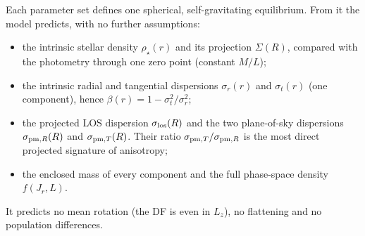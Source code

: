 \documentclass[11pt,a4paper]{article}
\begin{document}
Each parameter set defines one spherical, self-gravitating equilibrium. From
it the model predicts, with no further assumptions:
\begin{itemize}
\item the intrinsic stellar density $\rho_\star(r)$ and its projection
  $\Sigma(R)$, compared with the photometry through one zero point
  (constant $M/L$);
\item the intrinsic radial and tangential dispersions $\sigma_r(r)$ and
  $\sigma_t(r)$ (one component), hence $\beta(r)=1-\sigma_t^2/\sigma_r^2$;
\item the projected LOS dispersion $\sigma_{\rm los}(R)$ and the two
  plane-of-sky dispersions $\sigma_{{\rm pm},R}(R)$ and
  $\sigma_{{\rm pm},T}(R)$. Their ratio
  $\sigma_{{\rm pm},T}/\sigma_{{\rm pm},R}$ is the most direct projected
  signature of anisotropy;
\item the enclosed mass of every component and the full phase-space density
  $f(J_r,L)$.
\end{itemize}
It predicts no mean rotation (the DF is even in $L_z$), no flattening and no
population differences.
\end{document}
